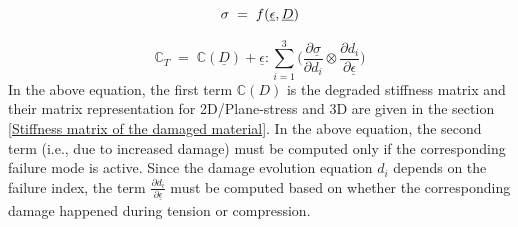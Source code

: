 \documentclass[12pt,a4paper,twoside,openright]{report}
\begin{document}
\begin{equation*}
\large{\sigma  \; = \; f(\underline{ \epsilon}, \underline{D} ) }
\end{equation*}

\begin{equation}
\mathbb{C}_{T}  \; = \; \mathbb{C}(\underline{D}) + \underline{ \epsilon}  : \sum_{i = 1}^{3}  \Big( \frac{\partial \underline{\sigma} }{\partial d_{i}} \otimes \frac{\partial d_{i}}{\partial \underline{ \epsilon} }\Big)
\label{Anisotropic tangent stiffness} 
\end{equation}
In the above equation, the first term $\mathbb{C}(D)$ is the degraded stiffness matrix and their matrix representation for 2D/Plane-stress and 3D are given in the section \ref{Stiffness matrix of the damaged material}.  In the above equation, the second term (i.e., due to increased damage) must be computed only if the corresponding failure mode is active. Since the damage evolution equation $d_{i}$ depends on the failure index, the term $\frac{\partial d_{i}}{\partial \underline{ \epsilon} }$ must be computed based on whether the corresponding damage happened during tension or compression.
\end{document}
